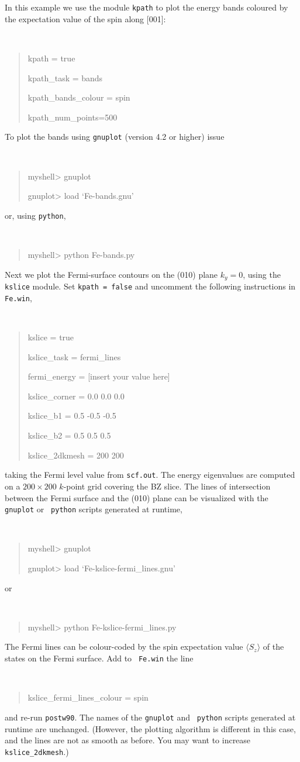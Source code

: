 \documentclass[a4paper,11pt,twoside]{article}
\begin{document}
 In this example we use the module {\tt kpath} to plot the energy
  bands coloured by the expectation value of the spin along [001]:
  {\tt
\begin{quote}
kpath = true

kpath\_task = bands

kpath\_bands\_colour = spin     

kpath\_num\_points=500
\end{quote} }


To plot the bands using {\tt gnuplot} (version 4.2 or higher) issue
%
{\tt
\begin{quote}
myshell> gnuplot

gnuplot> load `Fe-bands.gnu'
\end{quote} }
%
or, using {\tt python},
%
{\tt
\begin{quote}
myshell> python Fe-bands.py
\end{quote} }

Next we plot the Fermi-surface contours on the (010) plane $k_y=0$,
using the {\tt kslice} module. Set {\tt kpath = false} and uncomment
the following instructions in {\tt Fe.win}, 
%
{\tt
\begin{quote}
kslice = true

kslice\_task = fermi\_lines

fermi\_energy = [insert your value here] 

kslice\_corner = 0.0  0.0  0.0

kslice\_b1 =     0.5 -0.5 -0.5

kslice\_b2 =     0.5  0.5  0.5

kslice\_2dkmesh = 200 200
\end{quote} }

taking the Fermi level value from {\tt scf.out}. The energy
eigenvalues are computed on a $200\times 200$ $k$-point grid covering
the BZ slice. The lines of intersection between the Fermi surface and
the (010) plane can be visualized with the {\tt gnuplot} or {\tt
  python} scripts generated at runtime,
%
{\tt
\begin{quote}
myshell> gnuplot

gnuplot> load `Fe-kslice-fermi\_lines.gnu'
\end{quote} }
%
or 
%
{\tt
\begin{quote}
myshell> python Fe-kslice-fermi\_lines.py
\end{quote} }
%
The Fermi lines can be colour-coded by the spin expectation value
$\langle S_z\rangle$ of the states on the Fermi surface. Add to {\tt
  Fe.win} the line {\tt
\begin{quote}
kslice\_fermi\_lines\_colour = spin
\end{quote} }
%
and re-run {\tt postw90}. The names of the {\tt gnuplot} and {\tt
  python} scripts generated at runtime are unchanged. (However, the
plotting algorithm is different in this case, and the lines are not as
smooth as before. You may want to increase {\tt kslice\_2dkmesh}.)
\end{document}
